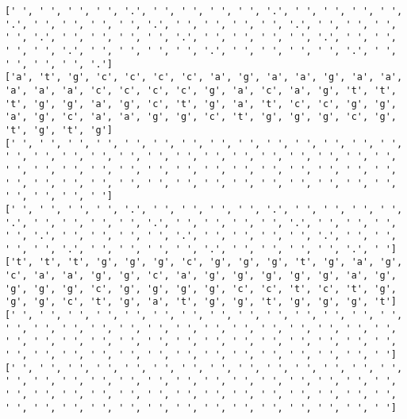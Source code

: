\documentclass{article}
\begin{document}
\begin{Verbatim}
[' ', ' ', ' ', ' ', '.', ' ', ' ', ' ', ' ', '.', ' ', ' ', ' ', ' ', '.', ' ', ' ', ' ', ' ', '.', ' ', ' ', ' ', ' ', '.', ' ', ' ', ' ', ' ', '.', ' ', ' ', ' ', ' ', '.', ' ', ' ', ' ', ' ', '.', ' ', ' ', ' ', ' ', '.', ' ', ' ', ' ', ' ', '.', ' ', ' ', ' ', ' ', '.', ' ', ' ', ' ', ' ', '.']
['a', 't', 'g', 'c', 'c', 'c', 'c', 'a', 'g', 'a', 'a', 'g', 'a', 'a', 'a', 'a', 'a', 'c', 'c', 'c', 'c', 'g', 'a', 'c', 'a', 'g', 't', 't', 't', 'g', 'g', 'a', 'g', 'c', 't', 'g', 'a', 't', 'c', 'c', 'g', 'g', 'a', 'g', 'c', 'a', 'a', 'g', 'g', 'c', 't', 'g', 'g', 'g', 'c', 'g', 't', 'g', 't', 'g']
[' ', ' ', ' ', ' ', ' ', ' ', ' ', ' ', ' ', ' ', ' ', ' ', ' ', ' ', ' ', ' ', ' ', ' ', ' ', ' ', ' ', ' ', ' ', ' ', ' ', ' ', ' ', ' ', ' ', ' ', ' ', ' ', ' ', ' ', ' ', ' ', ' ', ' ', ' ', ' ', ' ', ' ', ' ', ' ', ' ', ' ', ' ', ' ', ' ', ' ', ' ', ' ', ' ', ' ', ' ', ' ', ' ', ' ', ' ', ' ']
[' ', ' ', ' ', ' ', '.', ' ', ' ', ' ', ' ', '.', ' ', ' ', ' ', ' ', '.', ' ', ' ', ' ', ' ', '.', ' ', ' ', ' ', ' ', '.', ' ', ' ', ' ', ' ', '.', ' ', ' ', ' ', ' ', '.', ' ', ' ', ' ', ' ', '.', ' ', ' ', ' ', ' ', '.', ' ', ' ', ' ', ' ', '.', ' ', ' ', ' ', ' ', '.', ' ']
['t', 't', 't', 'g', 'g', 'g', 'c', 'g', 'g', 'g', 't', 'g', 'a', 'g', 'c', 'a', 'a', 'g', 'g', 'c', 'a', 'g', 'g', 'g', 'g', 'g', 'a', 'g', 'g', 'g', 'g', 'c', 'g', 'g', 'g', 'g', 'c', 'c', 't', 'c', 't', 'g', 'g', 'g', 'c', 't', 'g', 'a', 't', 'g', 'g', 't', 'g', 'g', 'g', 't']
[' ', ' ', ' ', ' ', ' ', ' ', ' ', ' ', ' ', ' ', ' ', ' ', ' ', ' ', ' ', ' ', ' ', ' ', ' ', ' ', ' ', ' ', ' ', ' ', ' ', ' ', ' ', ' ', ' ', ' ', ' ', ' ', ' ', ' ', ' ', ' ', ' ', ' ', ' ', ' ', ' ', ' ', ' ', ' ', ' ', ' ', ' ', ' ', ' ', ' ', ' ', ' ', ' ', ' ', ' ', ' ']
[' ', ' ', ' ', ' ', ' ', ' ', ' ', ' ', ' ', ' ', ' ', ' ', ' ', ' ', ' ', ' ', ' ', ' ', ' ', ' ', ' ', ' ', ' ', ' ', ' ', ' ', ' ', ' ', ' ', ' ', ' ', ' ', ' ', ' ', ' ', ' ', ' ', ' ', ' ', ' ', ' ', ' ', ' ', ' ', ' ', ' ', ' ', ' ', ' ', ' ', ' ', ' ', ' ', ' ', ' ', ' ']
 

\end{Verbatim}
\end{document}
